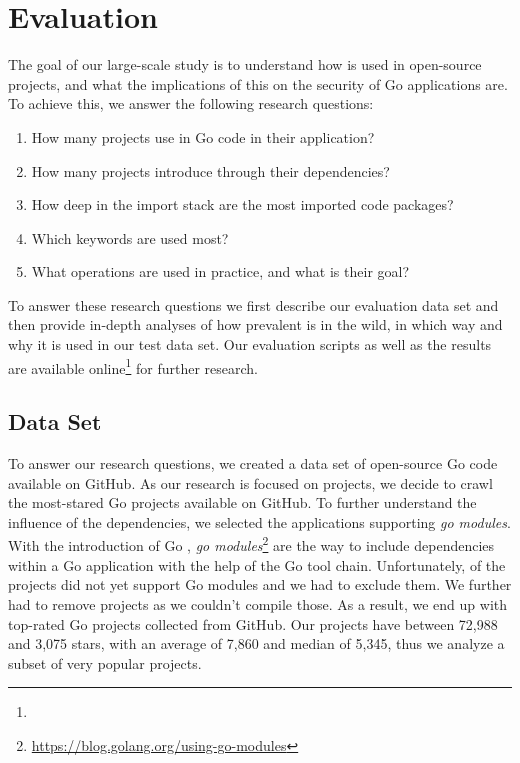 \section{Evaluation}
\label{sec:eval}

The goal of our large-scale study is to understand how \unsafe{} is used in open-source projects, and what the implications of this on the security of Go applications are. 
To achieve this, we answer the following research questions:

\begin{enumerate}[leftmargin=*,label={RQ\arabic*}]
    \item How many projects use \unsafe{} in Go code in their application? \label{rq:prevalApp}
    \item How many projects introduce \unsafe{} through their dependencies? \label{rq:prevalDeps}
    \item How deep in the import stack are the most imported \unsafe{} code packages? \label{rq:depsDepth}
    \item Which \unsafe{} keywords are used most? \label{rq:distTypes}
    \item What \unsafe{} operations are used in practice, and what is their goal? \label{rq:purpose}
\end{enumerate}

%

To answer these research questions we first describe our evaluation data set and then provide in-depth analyses of how prevalent \unsafe{} is in the wild, in which way and why it is used in our test data set.
Our evaluation scripts as well as the results are available online\footnote{} for further research.





\subsection{Data Set}

To answer our research questions, we created a data set of open-source Go code available on GitHub.
As our research is focused on projects, we decide to crawl the \initalProjs{} most-stared Go projects available on GitHub. 
To further understand the influence of the dependencies, we selected the applications supporting \textit{go modules}.
With the introduction of Go , \textit{go modules}\footnote{\url{https://blog.golang.org/using-go-modules}} are the way to include dependencies within a Go application with the help of the Go tool chain. 
Unfortunately, \withoutModules{} of the projects did not yet support Go modules and we had to exclude them.
We further had to remove \notCompiled{} projects as we couldn't compile those.
As a result, we end up with \projsAnalyzed{} top-rated Go projects collected from GitHub.
Our projects have between 72,988 and 3,075 stars, with an average of 7,860 and median of 5,345, thus we analyze a subset of very popular projects.


